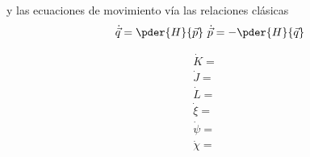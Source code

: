 y las ecuaciones de movimiento vía las relaciones clásicas
\begin{equation*}
\begin{aligned}[c]
\dot{\vec{q}} = \pder{H}{\vec{p}}
\end{aligned}
\ 
\begin{aligned}[c]
\dot{\vec{p}} = -\pder{H}{\vec{q}}
\end{aligned}
\end{equation*}

\begin{align}
\dot{K} =& \\
\dot{J} =& \\
\dot{L} =& \\
\dot{\xi} =& \\
\dot{\psi} =& \\
\dot{\chi} =& 
\end{align}





